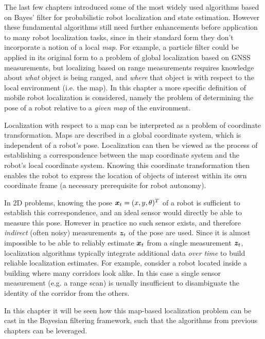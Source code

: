 The last few chapters introduced some of the most widely used algorithms based on Bayes' filter for probabilistic robot localization and state estimation. However these fundamental algorithms still need further enhancements before application to many robot localization tasks, since in their standard form they don't incorporate a notion of a local \textit{map}. For example, a particle filter could be applied in its original form to a problem of global localization based on GNSS measurements, but localizing based on range measurements requires knowledge about \textit{what} object is being ranged, and \textit{where} that object is with respect to the local environment (i.e. the map).
In this chapter a more specific definition of mobile robot localization is considered\cite{ThrunBurgardEtAl2005}, namely the problem of determining the pose of a robot relative to a \textit{given map} of the environment.

Localization with respect to a map can be interpreted as a problem of coordinate transformation. Maps are described in a global coordinate system, which is independent of a robot’s pose. Localization can then be viewed as the process of establishing a correspondence between the map coordinate system and the robot’s local coordinate system. Knowing this coordinate transformation then enables the robot to express the location of objects of interest within its own coordinate frame (a necessary prerequisite for robot autonomy).


In 2D problems, knowing the pose $\bm{x}_t = (x, y, \theta)^T$ of a robot is sufficient to establish this correspondence, and an ideal sensor would directly be able to measure this pose. However in practice no such sensor exists, and therefore \textit{indirect} (often noisy) measurements $\bm{z}_t$ of the pose are used. Since it is almost impossible to be able to reliably estimate $\bm{x}_t$ from a single measurement $\bm{z}_t$, localization algorithms typically integrate additional data \textit{over time} to build reliable localization estimates. For example, consider a robot located inside a building where many corridors look alike. In this case a single sensor measurement (e.g. a range scan) is usually insufficient to disambiguate the identity of the corridor from the others.

In this chapter it will be seen how this map-based localization problem can be cast in the Bayesian filtering framework, such that the algorithms from previous chapters can be leveraged.


